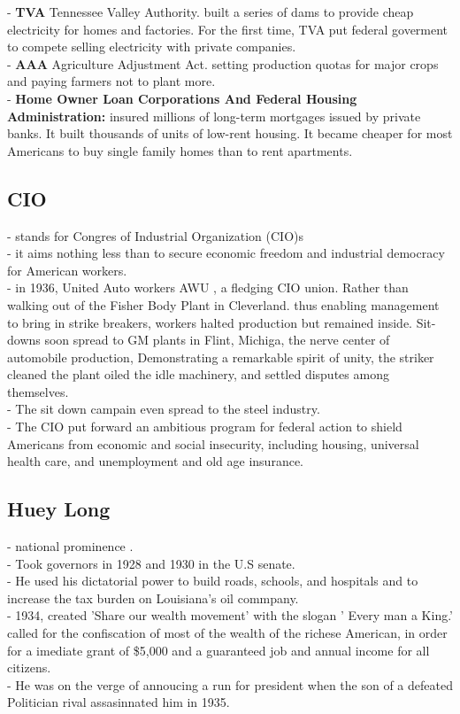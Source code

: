 \documentclass{article}
\begin{document}
- \textbf{TVA} Tennessee Valley Authority. built a series of dams to provide cheap electricity for homes and factories. For the first time, TVA put federal goverment to compete selling electricity with private companies.\\
- \textbf{AAA} Agriculture Adjustment Act. setting production quotas for major crops and paying farmers not to plant more. \\
- \textbf{ Home Owner Loan Corporations And Federal Housing Administration: } insured millions of long-term mortgages issued by private banks. It built thousands of units of low-rent housing. It became cheaper for most Americans to buy single family homes than to rent apartments.

\subsection{CIO}
- stands for Congres of Industrial Organization (CIO)s\\
- it aims nothing less than to secure economic freedom and industrial democracy for American workers.\\
- in 1936, United Auto workers AWU , a fledging CIO union. Rather than walking out of the Fisher Body Plant in Cleverland. thus enabling management to bring in strike breakers, workers halted production but remained inside. Sit-downs soon spread to GM plants in Flint, Michiga, the nerve center of automobile production, Demonstrating a remarkable spirit of unity, the striker cleaned the plant oiled the idle machinery, and settled disputes among themselves.\\
- The sit down campain even spread to the steel industry. \\
- The CIO put forward an ambitious program for federal action to shield Americans from economic and social insecurity, including housing, universal health care, and unemployment and old age insurance.\\


\subsection{Huey Long }
- national prominence .\\
- Took governors in 1928 and 1930 in the U.S senate.\\
- He used his dictatorial power to build roads, schools, and hospitals and to increase the tax burden on Louisiana's oil commpany.\\
- 1934, created 'Share our wealth movement' with the slogan ' Every man a King.' called for the confiscation of most of the wealth of the richese American, in order for a imediate grant of \$5,000 and a guaranteed job and annual income for all citizens.\\
- He was on the verge of annoucing a run for president when the son of a defeated Politician rival assasinnated him in 1935.\\
\end{document}
